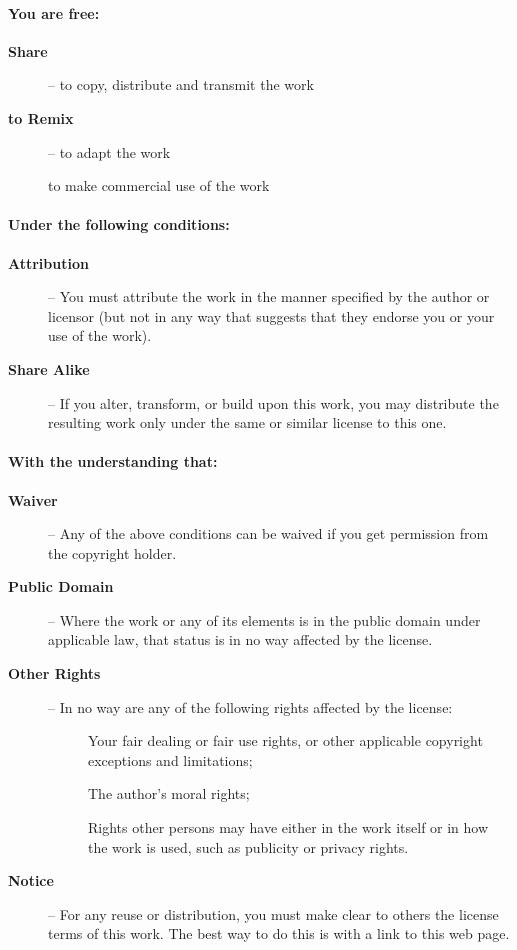 \noindent \paragraph{You are free:}
\begin{description}
\item[{\bf Share}] -- to copy, distribute and transmit the work
\item[{\bf to Remix}] -- to adapt the work 
\item[] to make commercial use of the work
\end{description}
\noindent \paragraph{Under the following conditions:}
\begin{description}
\item[{\large \ccAttribution} {\bf Attribution}] -- You must attribute the work in the manner specified by the author or licensor (but not in any way that suggests that they endorse you or your use of the work).
\item[{\large \ccShareAlike} {\bf Share Alike}] -- If you alter, transform, or build upon this work, you may distribute the resulting work only under the same or similar license to this one.
\end{description}

\noindent \paragraph{With the understanding that:}

\begin{description}
\item[{\bf Waiver}] -- Any of the above conditions can be waived if you get permission from the copyright holder.
\item[{\bf Public Domain}] -- Where the work or any of its elements is in the public domain under applicable law, that status is in no way affected by the license.
\item[{\bf Other Rights}] -- In no way are any of the following rights affected by the license:
\begin{description}
\item[] Your fair dealing or fair use rights, or other applicable copyright exceptions and limitations;
\item[] The author's moral rights;
\item[] Rights other persons may have either in the work itself or in how the work is used, such as publicity or privacy rights.
\end{description}
\item[{\bf Notice}] -- For any reuse or distribution, you must make clear to others the license terms of this work. The best way to do this is with a link to this web page.
\end{description}
